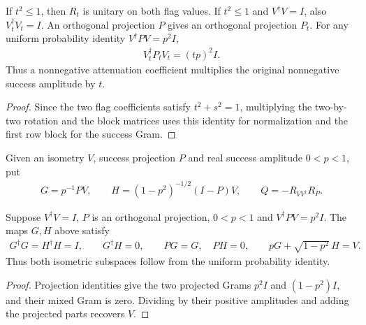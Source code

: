 \begin{lemma}
    \label{thm:mpu_uniform_success_attenuation}
    \leanok
    If $t^2\leq1$, then $R_t$ is unitary on both flag values.
    If $t^2\leq1$ and $V^\dagger V=I$, also $V_t^\dagger V_t=I$.
    An orthogonal projection $P$ gives an orthogonal projection $P_t$.
    For any uniform probability identity
    $V^\dagger PV=p^2I$,
    \begin{align}
        V_t^\dagger P_tV_t=(tp)^2I.
    \end{align}
    Thus a nonnegative attenuation coefficient multiplies the
    original nonnegative success amplitude by $t$.
\end{lemma}
\begin{proof}\leanok
    Since the two flag coefficients satisfy $t^2+s^2=1$, multiplying the
    two-by-two rotation and the block matrices uses this identity
    for normalization and the first row block for the success Gram.
\end{proof}

\begin{definition}
    \label{def:mpu_uniform_postselection}
    \leanok
    Given an isometry $V$, success projection $P$ and real
    success amplitude $0<p<1$, put
    \begin{align}
        G=p^{-1}PV,\qquad H=(1-p^2)^{-1/2}(I-P)V,
        \qquad Q=-R_{VV^\dagger}R_P.
    \end{align}
\end{definition}

\begin{lemma}
    \label{thm:mpu_uniform_postselection_decomposition}
    \leanok
    Suppose $V^\dagger V=I$, $P$ is an orthogonal projection,
    $0<p<1$ and $V^\dagger PV=p^2I$. The maps $G,H$ above satisfy
    \begin{align}
        G^\dagger G=H^\dagger H=I,\qquad G^\dagger H=0,
        \qquad PG=G,\quad PH=0,
        \qquad pG+\sqrt{1-p^2}\,H=V.
    \end{align}
    Thus both isometric subspaces follow from the uniform probability
    identity.
\end{lemma}
\begin{proof}\leanok
    Projection identities give the two projected Grams $p^2I$ and
    $(1-p^2)I$, and their mixed Gram is zero. Dividing by their
    positive amplitudes and adding the projected parts recovers $V$.
\end{proof}

